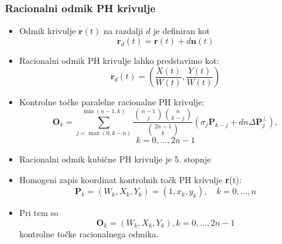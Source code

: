\documentclass[12pt]{beamer}
\theoremstyle{definition} %
\theoremstyle{plain} %
\begin{document}
\begin{frame}
    \frametitle{Racionalni odmik PH krivulje}
        \begin{itemize}
            \item Odmik krivulje $\textbf{r}(t)$ na razdalji $d$ je definiran kot 
                  $$\textbf{r}_d(t) = \textbf{r}(t) + d \textbf{n}(t)$$
            \item Racionalni odmik PH krivulje lahko predstavimo kot:
                  $$ \textbf{r}_d(t) = \left(\frac{X(t)}{W(t)}, \frac{Y(t)}{W(t)}\right)$$ 
            \item Kontrolne točke paralelne racionalne PH krivulje:
                  $$\textbf{O}_k = \sum_{j=\max(0, k-n)}^{\min(n-1, k)} \frac{\binom{n-1}{j} \binom{n}{k-j}}{\binom{2n-1}{k}}(\sigma_j \textbf{P}_{k-j}+ d n \Delta\textbf{P}^\perp_j),$$ 
                  $$k=0, ..., 2n-1$$
        \end{itemize}

    \end{frame}
    \begin{frame}
        \begin{itemize}
            \item Racionalni odmik kubične PH krivulje je 5. stopnje
            \item Homogeni zapis koordinat kontrolnih točk PH krivulje \textbf{r}(t):
                  $$ \textbf{P}_k = (W_k, X_k, Y_k) = (1, x_k, y_k), \quad k = 0, ..., n$$
            \item Pri tem so
                  $$\textbf{O}_k = (W_k, X_k, Y_k), k = 0, ..., 2n-1$$
                  kontrolne točke racionalnega odmika.
            
        \end{itemize}
    \end{frame}
    
\end{document}
